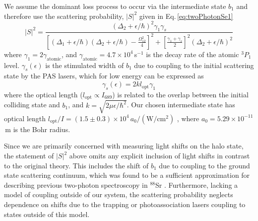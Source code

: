 We assume the dominant loss process to occur via the intermediate state $b_1$ and therefore use the scattering probability, $\vert S \vert^2 $ given in Eq.\,\ref{eq:twoPhotonSe1} 
\begin{equation} \label{eq:4sprob}
	\vert  S \vert^2 = \frac{(\Delta_2 + \epsilon/\hbar)^2 \gamma_1 \gamma_s}{
  	\left[ (\Delta_1+\epsilon/\hbar) (\Delta_2+\epsilon/\hbar)-\frac{\Omega_{12}^{2}}{4}\right]^2 + \left[ \frac{\gamma_1 + \gamma_s}{2}\right]^2 (\Delta_2+\epsilon/\hbar)^2}
\end{equation}
where ${\gamma}_{1}=2\gamma_{\text{atomic}}$, and $\gamma_{\text{atomic}}=4.7\times 10^4$\,s$^{-1}$ is the decay rate of the atomic $^3P_1$ level.
${\gamma}_{s}(\epsilon)$ is the stimulated width of $b_1$ due to coupling to the initial scattering state by the PAS lasers, which for low energy can be expressed as \cite{fks96,Bohn1996,Napolitano1994,bav00,Bohn1999}
\begin{equation} \label{equationstimulatedwidth}
	{\gamma}_{s}(\epsilon)=2k l_{\text{opt}} \gamma_1
\end{equation}
where the optical length ($l_{\text{opt}}\propto I_{689}$) is related to the overlap between the initial colliding state and $b_1$, and $k=\sqrt{2\mu \epsilon/ \hbar^2}$.
Our chosen intermediate state has optical length $l_{\text{opt}}/I=(1.5\pm0.3)\times 10^4\,a_0\mathrm{/(W/cm^2)}$ \cite{Borkowski2014a}, where $a_0=5.29\times 10^{-11}$\,m is the Bohr radius.

Since we are primarily concerned with measuring light shifts on the halo state, the statement of $\vert S \vert^2$ above omits any explicit inclusion of light shifts in contrast to the original theory.
This includes the shift of $b_1$ due to coupling to the ground state scattering continuum, which was found to be a sufficient approximation for describing previous two-photon spectroscopy in $^{88}$Sr \cite{MartinezDeEscobar2008}.
Furthermore, lacking a model of coupling outside of our system, the scattering probability neglects dependence on shifts due to the trapping or photoassociation lasers coupling to states outside of this model.

